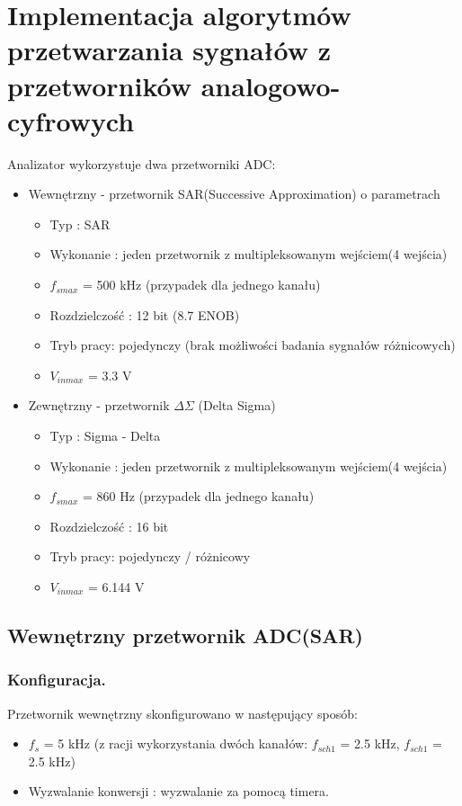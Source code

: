 \section{Implementacja algorytmów przetwarzania sygnałów z przetworników analogowo-cyfrowych}
Analizator wykorzystuje dwa przetworniki ADC:
\begin{itemize}
    \item Wewnętrzny - przetwornik SAR(Successive Approximation) o parametrach
        \begin{itemize}
            \item Typ : SAR
            \item Wykonanie : jeden przetwornik z multipleksowanym wejściem(4 wejścia) 
            \item $f_{smax}$ = 500 kHz (przypadek dla jednego kanału)
            \item Rozdzielczość : 12 bit (8.7 ENOB)
            \item Tryb pracy: pojedynczy (brak możliwości badania sygnałów różnicowych) 
            \item $V_{inmax}$ = 3.3 V
        \end{itemize}
        
    \item Zewnętrzny - przetwornik $\Delta\Sigma$ (Delta Sigma)
        \begin{itemize}
            \item Typ : Sigma - Delta
            \item Wykonanie : jeden przetwornik z multipleksowanym wejściem(4 wejścia) 
            \item $f_{smax}$ = 860 Hz (przypadek dla jednego kanału)
            \item Rozdzielczość : 16 bit 
            \item Tryb pracy: pojedynczy / różnicowy
            \item $V_{inmax}$ = 6.144 V
        \end{itemize}
\end{itemize}

\subsection{Wewnętrzny przetwornik ADC(SAR)}
\subsubsection{Konfiguracja.}
Przetwornik wewnętrzny skonfigurowano w następujący sposób:
    \begin{itemize}
        \item $f_{s}$ = 5 kHz (z racji wykorzystania dwóch kanałów: $f_{sch1}$ = 2.5 kHz, $f_{sch1}$ = 2.5 kHz)
        \item Wyzwalanie konwersji : wyzwalanie za pomocą timera. 
    \end{itemize}

